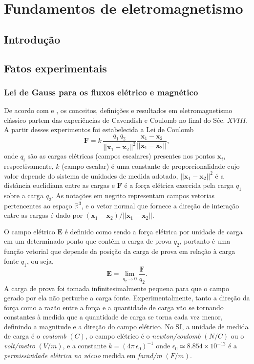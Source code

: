 \chapter{Fundamentos de eletromagnetismo}\label{sec.fund_eletr}

\section{Introdução}

\section{Fatos experimentais}

\subsection{Lei de Gauss para os fluxos elétrico e magnético}
De acordo com \cite{jackson_classical_1999} e \cite{sommerfeld_52} , os conceitos, definições e resultados em eletromagnetismo clássico partem das experiências de Cavendish e Coulomb no final do Séc. $XVIII$. A partir desses experimentos foi estabelecida a Lei de Coulomb
\begin{equation}\label{eq.forc_elet}
\textbf{F}=k\,\frac{q_1\,q_2}{||\textbf{x}_1-\textbf{x}_2||^2}\frac{\textbf{x}_1-\textbf{x}_2}{||\textbf{x}_1-\textbf{x}_2||},
\end{equation}
onde $q_i$ são as cargas elétricas (campos escalares) presentes nos pontos $\textbf{x}_i$, respectivamente, $k$ (campo escalar) é uma constante de proporcionalidade cujo valor depende do sistema de unidades de medida adotado, $||\textbf{x}_1-\textbf{x}_2||^2$ é a distância euclidiana entre as cargas e $\textbf{F}$ é a força elétrica exercida pela carga $q_1$ sobre a carga $q_2$. As notações em negrito representam campos vetorias pertencentes ao espaço $\mathbb{R}^3$, e o vetor normal que fornece a direção de interação entre as cargas é dado por $(\textbf{x}_1-\textbf{x}_2)/||\textbf{x}_1-\textbf{x}_2||$.

O campo elétrico $\textbf{E}$ é definido como sendo a força elétrica por unidade de carga em um determinado ponto que contém a carga de prova $q_2$, portanto é uma função vetorial que depende da posição da carga de prova em relação à carga fonte $q_1$, ou seja,
\begin{equation}\label{eq.camp_elet}
\textbf{E}=\lim_{q_2\to 0}\frac{\textbf{F}}{q_2}.
\end{equation}
A carga de prova foi tomada infinitesimalmente pequena para que o campo gerado por ela não perturbe a carga fonte. Experimentalmente, tanto a direção da força como a razão entre a força e a quantidade de carga vão se tornando constantes à medida que a quantidade de carga se torna cada vez menor, definindo a magnitude e a direção do campo elétrico. No SI, a unidade de medida de carga é o \textit{coulomb} $(C)$, o campo elétrico é o \textit{newton/coulomb} $(N/C)$ ou o \textit{volt/metro} $(V/m)$, e a constante $k=(4\pi\,\epsilon_0)^{-1}$ onde $\epsilon_0\simeq8.854\times10^{-12}$ é a \textit{permissividade elétrica no vácuo} medida em \textit{farad/m} $(F/m)$.

